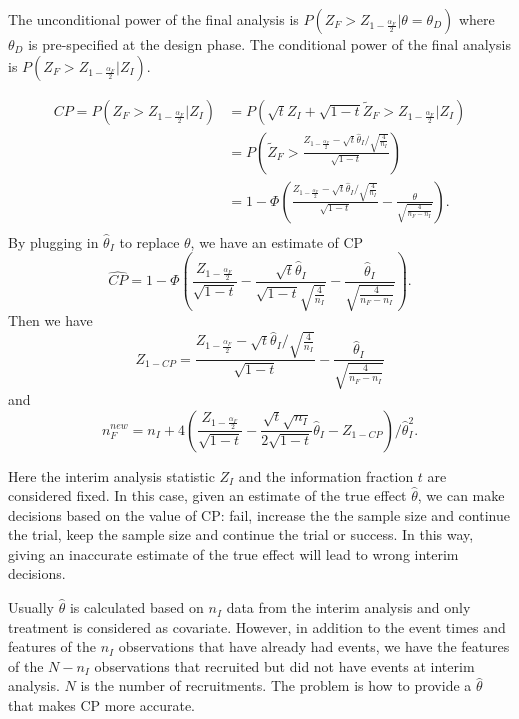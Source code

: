 \documentclass[12pt]{article}
\begin{document}
The unconditional power of the final analysis is
$P(Z_{F}>Z_{1-\frac{\alpha_{F}}{2}}|\theta=\theta_{D})$ where $\theta_{D}$ is
pre-specified at the design phase. The conditional power of the final analysis
is $P(Z_{F}>Z_{1-\frac{\alpha_{F}}{2}} | Z_{I})$.

\begin{align*} CP = P(Z_{F}>Z_{1-\frac{\alpha_{F}}{2}} | Z_{I}) &= P(\sqrt{t}Z_{I} +
\sqrt{1-t}\tilde{Z}_{F}>Z_{1-\frac{\alpha_{F}}{2}} | Z_{I}) \\ 
&= P\left(
\tilde{Z}_{F} > \frac{Z_{1-\frac{\alpha_{F}}{2}} - \sqrt{t}\hat{\theta}_{I} /
\sqrt{\frac{4}{n_{I}}}}{\sqrt{1-t}} \right) \\ &= 1 -\Phi\left(
\frac{Z_{1-\frac{\alpha_{F}}{2}} - \sqrt{t}\hat{\theta}_{I} /
\sqrt{\frac{4}{n_{I}}}}{\sqrt{1-t}} - \frac{\theta}{\sqrt{\frac{4}{n_{F}-n_{I}}}}\right). \\
 \end{align*}
By plugging in $\hat{\theta}_{I}$ to replace $\theta$, we have an estimate of CP
$$\hat{CP} =  1 -\Phi\left(
 \frac{Z_{1-\frac{\alpha_{F}}{2}}}{\sqrt{1-t}} -
\frac{\sqrt{t}\hat{\theta}_{I}}{\sqrt{1-t}\sqrt{\frac{4}{n_{I}}}}
-\frac{\hat{\theta}_{I}}{\sqrt{\frac{4}{n_{F}-n_{I}}}}\right).$$
Then we have $$Z_{1-CP}=\frac{Z_{1-\frac{\alpha_{F}}{2}} -
\sqrt{t}\hat{\theta}_{I} / \sqrt{\frac{4}{n_{I}}}}{\sqrt{1-t}} -
\frac{\hat{\theta}_{I}}{\sqrt{\frac{4}{n_{F}-n_{I}}}}$$ and $$n_{F}^{new} =
n_{I} + 4\left(\frac{Z_{1-\frac{\alpha_F}{2}}}{\sqrt{1-t}} -
\frac{\sqrt{t}\sqrt{n_{I}}}{2\sqrt{1-t}}\hat{\theta}_{I} - Z_{1-CP}\right) /
\hat{\theta}_{I}^2.$$

Here the interim analysis statistic $Z_{I}$ and the information fraction $t$
are considered fixed. In this case, given an estimate of the true
effect $\hat{\theta}$, we can make decisions based on the value of CP:
fail, increase the the sample size and continue the trial, keep the
sample size and continue the trial or success. In this way, giving an
inaccurate estimate of the true effect will lead to wrong interim
decisions.

Usually $\hat{\theta}$ is calculated based on $n_{I}$ data from the
interim analysis and only treatment is considered as covariate. However, in addition to the event times and features
of the $n_{I}$ observations that have already had events, we have the
features of the $N-n_{I}$ observations that recruited but did not have
events at interim analysis. $N$ is the number of recruitments. The
problem is how to provide a $\hat{\theta}$ that makes CP more
accurate.
\end{document}
